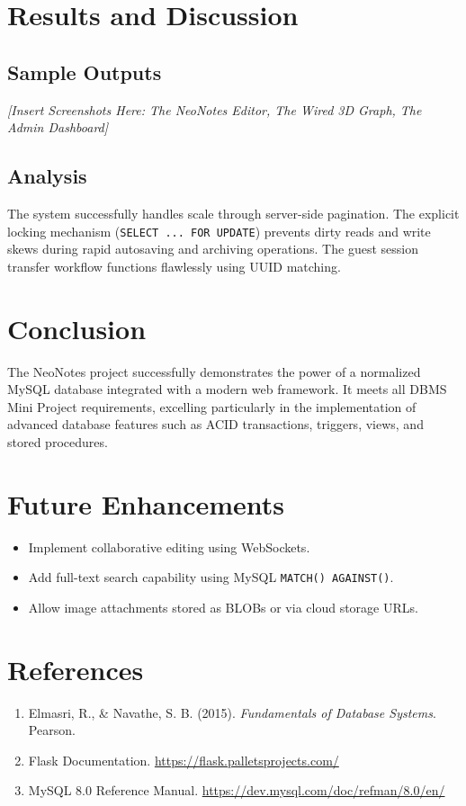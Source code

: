 \documentclass[12pt,a4paper]{report}
\begin{document}
\chapter{Results and Discussion}
\section{Sample Outputs}
\textit{[Insert Screenshots Here: The NeoNotes Editor, The Wired 3D Graph, The Admin Dashboard]}

\section{Analysis}
The system successfully handles scale through server-side pagination. The explicit locking mechanism (\texttt{SELECT ... FOR UPDATE}) prevents dirty reads and write skews during rapid autosaving and archiving operations. The guest session transfer workflow functions flawlessly using UUID matching.

\chapter{Conclusion}
The NeoNotes project successfully demonstrates the power of a normalized MySQL database integrated with a modern web framework. It meets all DBMS Mini Project requirements, excelling particularly in the implementation of advanced database features such as ACID transactions, triggers, views, and stored procedures.

\chapter{Future Enhancements}
\begin{itemize}
    \item Implement collaborative editing using WebSockets.
    \item Add full-text search capability using MySQL \texttt{MATCH() AGAINST()}.
    \item Allow image attachments stored as BLOBs or via cloud storage URLs.
\end{itemize}

\chapter*{References}
\begin{enumerate}
    \item Elmasri, R., \& Navathe, S. B. (2015). \textit{Fundamentals of Database Systems}. Pearson.
    \item Flask Documentation. \url{https://flask.palletsprojects.com/}
    \item MySQL 8.0 Reference Manual. \url{https://dev.mysql.com/doc/refman/8.0/en/}
\end{enumerate}
\end{document}
